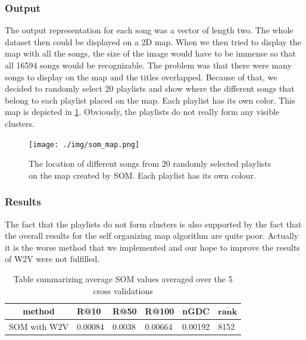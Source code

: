 \subsubsection{Output}
The output representation for each song was a vector of length two. The whole dataset then could be displayed on a 2D map. 
When we then tried to display the map with all the songs, the size of the image would have to be immense so that all 16594 songs would be recognizable. The problem was that there were many songs to display on the map and the titles overlapped. Because of that, we decided to randomly select 20 playlists and show where the different songs that belong to each playlist placed on the map. Each playlist has its own color. This map is depicted in \ref{fig:som_map}. Obviously, the playlists do not really form any visible clusters.
\begin{figure}[h]
    \centering
	\texttt{[image: ./img/som\_map.png]}
	\caption{The location of different songs from 20 randomly selected playlists on the map created by SOM. Each playlist has its own colour.}
	\label{fig:som_map}
\end{figure}
\subsubsection{Results}
The fact that the playlists do not form clusters is also supported by the fact that the overall results for the self organizing map algorithm are quite poor. Actually it is the worse method that we implemented and our hope to improve the results of W2V were not fulfilled.

\begin{table}[h!]
\centering
\renewcommand{\arraystretch}{1.5}
\begin{tabu} to 1\textwidth { | c || X[c] | X[c] | X[c] | X[c] | X[c] |}
 \hline
 \textbf{method} & \textbf{R@10} & \textbf{R@50} & \textbf{R@100} & \textbf{nGDC} & $ \boldsymbol{\overline{rank}} $ \\
 \hline
 \hline
 SOM with W2V & 0.00084 & 0.0038 & 0.00664 & 0.00192 & 8152 \\
 \hline
\end{tabu} \\
\caption{Table summarizing average SOM values averaged over the 5 cross validations}
\label{table:som}
\end{table}

